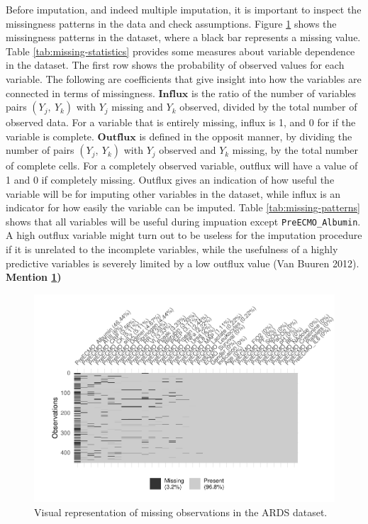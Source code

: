 \documentclass[12pt,]{article}
\begin{document}
Before imputation, and indeed multiple imputation, it is important to
inspect the missingness patterns in the data and check assumptions.
Figure \ref{fig:missing-data} shows the missingness patterns in the
dataset, where a black bar represents a missing value. Table
\ref{tab:missing-statistics} provides some measures about variable
dependence in the dataset. The first row shows the probability of
observed values for each variable. The following are coefficients that
give insight into how the variables are connected in terms of
missingness. \(\mathbf{Influx}\) is the ratio of the number of variables
pairs \((Y_j, ~Y_k)\) with \(Y_j\) missing and \(Y_k\) observed, divided
by the total number of observed data. For a variable that is entirely
missing, influx is 1, and 0 for if the variable is complete.
\(\mathbf{Outflux}\) is defined in the opposit manner, by dividing the
number of pairs \((Y_j, ~Y_k)\) with \(Y_j\) observed and \(Y_k\)
missing, by the total number of complete cells. For a completely
observed variable, outflux will have a value of 1 and 0 if completely
missing. Outflux gives an indication of how useful the variable will be
for imputing other variables in the dataset, while influx is an
indicator for how easily the variable can be imputed. Table
\ref{tab:missing-patterns} shows that all variables will be useful
during impuation except \texttt{PreECMO\_Albumin}. A high outflux
variable might turn out to be useless for the imputation procedure if it
is unrelated to the incomplete variables, while the usefulness of a
highly predictive variables is severely limited by a low outflux value
(Van Buuren 2012). \textbf{Mention \ref{fig:missing-data})}

\begin{figure}[H]

{\centering \includegraphics[width=1\linewidth]{figure/graphics-missing-data-1} 

}

\caption{\label{fig:missing-data}Visual representation of missing observations in the ARDS dataset.}\label{fig:missing-data}
\end{figure}
\end{document}
